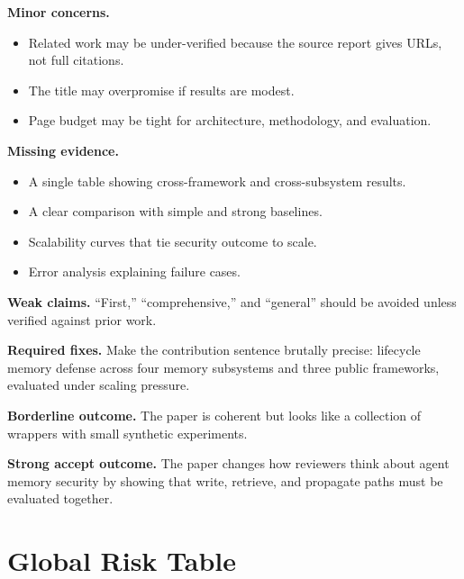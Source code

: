 \documentclass[11pt,oneside]{report}
\begin{document}
\textbf{Minor concerns.}
\begin{itemize}
  \item Related work may be under-verified because the source report gives URLs, not full citations.
  \item The title may overpromise if results are modest.
  \item Page budget may be tight for architecture, methodology, and evaluation.
\end{itemize}

\textbf{Missing evidence.}
\begin{itemize}
  \item A single table showing cross-framework and cross-subsystem results.
  \item A clear comparison with simple and strong baselines.
  \item Scalability curves that tie security outcome to scale.
  \item Error analysis explaining failure cases.
\end{itemize}

\textbf{Weak claims.} ``First,'' ``comprehensive,'' and ``general'' should be avoided unless verified
against prior work.

\textbf{Required fixes.} Make the contribution sentence brutally precise: lifecycle memory defense
across four memory subsystems and three public frameworks, evaluated under scaling pressure.

\textbf{Borderline outcome.} The paper is coherent but looks like a collection of wrappers with
small synthetic experiments.

\textbf{Strong accept outcome.} The paper changes how reviewers think about agent memory security by
showing that write, retrieve, and propagate paths must be evaluated together.

\section{Global Risk Table}
\end{document}
